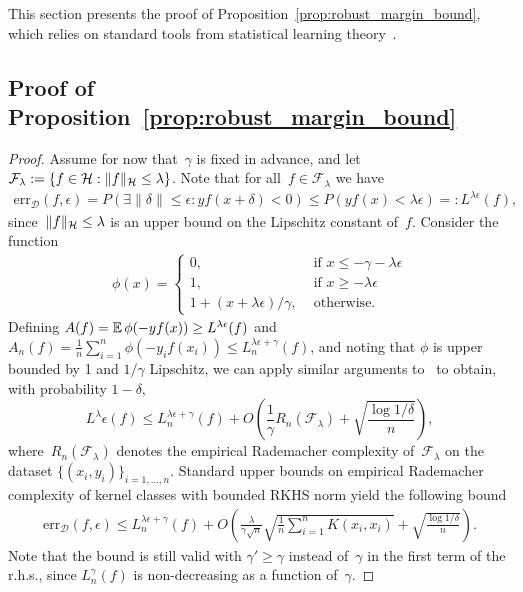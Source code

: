 
This section presents the proof of Proposition~\ref{prop:robust_margin_bound},
which relies on standard tools from statistical learning theory~\citep[\eg,][]{boucheron2005theory}.

\subsection{Proof of Proposition~\ref{prop:robust_margin_bound}}
\begin{proof}
Assume for now that~$\gamma$ is fixed in advance, and let $\mathcal F_\lambda := \{f \in {\mathcal H} : \|f\|_{\mathcal H} \leq \lambda\}$.
Note that for all~$f \in \mathcal F_\lambda$ we have
\begin{align*}
\text{err}_\mathcal{D}(f, \epsilon) = P(\exists \|\delta\| \leq \epsilon: y f(x + \delta) < 0) \leq P(yf(x) < \lambda \epsilon) =: L^{\lambda \epsilon}(f),
\end{align*}
since~$\|f\|_{\mathcal H} \leq \lambda$ is an upper bound on the Lipschitz constant of~$f$.
Consider the function
\begin{align*}
\phi(x) = \begin{cases}
	0, &\text{ if }x \leq -\gamma - \lambda \epsilon\\
	1, &\text{ if }x \geq - \lambda \epsilon\\
	1 + (x + \lambda \epsilon)/\gamma, &\text{ otherwise.}
\end{cases}
\end{align*}
Defining $A(f) = \operatorname{\mathbb{E}} \phi(-y f(x)) \geq L^{\lambda \epsilon}(f)$ and $A_n(f) = \frac{1}{n} \sum_{i=1}^n \phi(- y_i f(x_i)) \leq L_n^{\lambda \epsilon + \gamma}(f)$,
and noting that $\phi$ is upper bounded by 1 and $1/\gamma$ Lipschitz,
we can apply similar arguments to~\citep[Theorem 4.1]{boucheron2005theory} to obtain,
with probability $1 - \delta$,
\begin{equation*}
L^\lambda \epsilon(f) \leq L_n^{\lambda \epsilon + \gamma}(f) + O \left(\frac{1}{\gamma} R_n(\mathcal{F}_\lambda) + \sqrt{\frac{\log 1/\delta}{n}} \right),
\end{equation*}
where~$R_n(\mathcal{F}_\lambda)$ denotes the empirical Rademacher complexity of~$\mathcal{F}_\lambda$ on the dataset $\{(x_i, y_i)\}_{i=1, \ldots, n}$.
Standard upper bounds on empirical Rademacher complexity of kernel classes with bounded RKHS norm yield the following bound
\begin{align*}
\text{err}_\mathcal{D}(f, \epsilon) \leq L_n^{\lambda \epsilon + \gamma}(f) + O \left( \frac{\lambda}{\gamma \sqrt{n}} \sqrt{\frac{1}{n}\sum_{i=1}^n K(x_i, x_i)} + \sqrt{\frac{\log 1/\delta}{n}} \right).
\end{align*}
Note that the bound is still valid with $\gamma' \geq \gamma$ instead of~$\gamma$ in the first term
of the r.h.s., since $L_n^{\gamma}(f)$ is non-decreasing as a function of~$\gamma$.


\end{proof}
